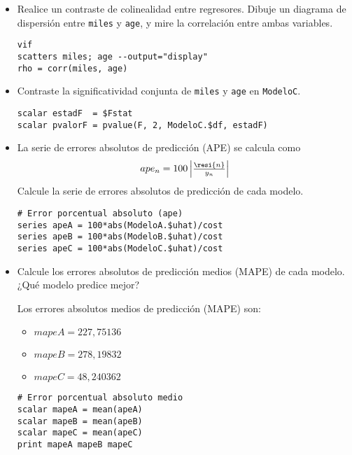 \documentclass[11pt]{article}
\begin{document}
\begin{itemize}
\item Realice un contraste de colinealidad entre regresores. Dibuje un
diagrama de dispersión entre \texttt{miles} y \texttt{age}, y mire la correlación
entre ambas variables.
{\vspace{0pt} \color{gray!70!black}
\begin{verbatim}
vif
scatters miles; age --output="display"
rho = corr(miles, age)
\end{verbatim}
}

\item Contraste la significatividad conjunta de \texttt{miles} y \texttt{age} en
\texttt{ModeloC}.
{\vspace{0pt} \color{gray!70!black}
\begin{verbatim}
scalar estadF  = $Fstat
scalar pvalorF = pvalue(F, 2, ModeloC.$df, estadF)
\end{verbatim}
}

\item La serie de errores absolutos de predicción (APE) se calcula como
\begin{displaymath}
  ape_n=100
  \begin{vmatrix}
    \frac{\resi{n}}{y_n}
  \end{vmatrix}
\end{displaymath}
Calcule la serie de errores absolutos de predicción de cada modelo.
{\vspace{0pt} \color{gray!70!black}
\begin{verbatim}
# Error porcentual absoluto (ape)
series apeA = 100*abs(ModeloA.$uhat)/cost
series apeB = 100*abs(ModeloB.$uhat)/cost
series apeC = 100*abs(ModeloC.$uhat)/cost
\end{verbatim}
}

\item Calcule los errores absolutos de predicción medios (MAPE) de cada
modelo. ¿Qué modelo predice mejor?

Los errores absolutos medios de predicción (MAPE) son:
\begin{itemize}
\item \(mapeA =  227,75136\)
\item \(mapeB =  278,19832\)
\item \(mapeC =  48,240362\)
\end{itemize}
{\vspace{0pt} \color{gray!70!black}
\begin{verbatim}
# Error porcentual absoluto medio 
scalar mapeA = mean(apeA)
scalar mapeB = mean(apeB)
scalar mapeC = mean(apeC)
print mapeA mapeB mapeC
\end{verbatim}
}
\end{itemize}
\end{document}
